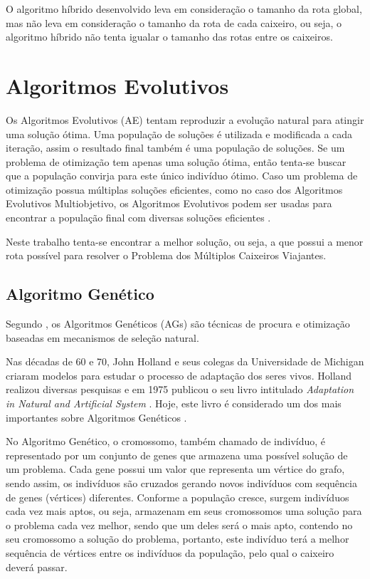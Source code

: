 \documentclass[12pt,openright,a4paper,twoside]{tcc}
\begin{document}
		O algoritmo híbrido desenvolvido leva em consideração o tamanho da rota global, mas não leva em consideração o tamanho da rota de cada caixeiro, ou seja, o algoritmo híbrido não tenta igualar o tamanho das rotas entre os caixeiros.
	
    \chapter{Algoritmos Evolutivos}

        Os Algoritmos Evolutivos (AE) tentam reproduzir a evolução natural para atingir uma solução ótima. Uma população de soluções é utilizada e modificada a cada iteração, assim o resultado final também é uma população de soluções. Se um problema de otimização tem apenas uma solução ótima, então tenta-se buscar que a população convirja para este único indivíduo ótimo. Caso um problema de otimização possua múltiplas soluções eficientes, como no caso dos Algoritmos Evolutivos Multiobjetivo, os Algoritmos Evolutivos podem ser usadas para encontrar a população final com diversas soluções eficientes \cite{malvezzi}.

        Neste trabalho tenta-se encontrar a melhor solução, ou seja, a que possui a menor rota possível para resolver o Problema dos Múltiplos Caixeiros Viajantes.

	\section{Algoritmo Genético}

		Segundo , os Algoritmos Genéticos (AGs) são técnicas de procura e otimização baseadas em mecanismos de seleção natural. 

		Nas décadas de 60 e 70, John Holland e seus colegas da Universidade de Michigan criaram modelos para estudar o processo de adaptação dos seres vivos. Holland realizou diversas pesquisas e em 1975 publicou o seu livro intitulado \textit{Adaptation in Natural and Artificial System} \cite{john}. Hoje, este livro é considerado um dos mais importantes sobre Algoritmos Genéticos \cite{0001-pdf}.

		No Algoritmo Genético, o cromossomo, também chamado de indivíduo, é representado por um conjunto de genes que armazena uma possível solução de um problema. Cada gene possui um valor que representa um vértice do grafo, sendo assim, os indivíduos são cruzados gerando novos indivíduos com sequência de genes (vértices) diferentes. Conforme a população cresce, surgem indivíduos cada vez mais aptos, ou seja, armazenam em seus cromossomos uma solução para o problema cada vez melhor, sendo que um deles será o mais apto, contendo no seu cromossomo a solução do problema, portanto, este indivíduo terá a melhor sequência de vértices entre os indivíduos da população, pelo qual o caixeiro deverá passar.
\end{document}

